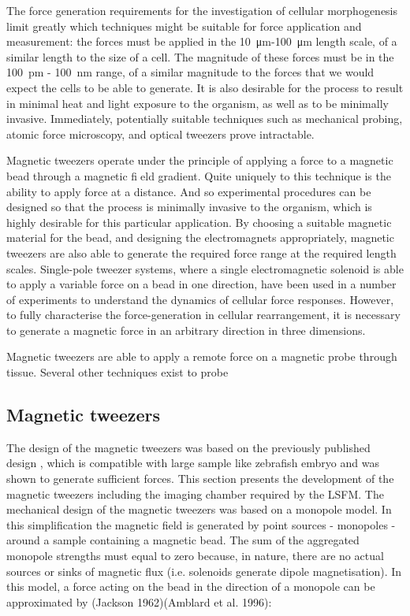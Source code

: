 The force generation requirements for the investigation of cellular morphogenesis limit greatly which techniques might be suitable for force application and measurement: the forces must be applied in the \SI{10}{\micro\meter}-\SI{100}{\micro\meter} length scale, of a similar length to the size of a cell.
The magnitude of these forces must be in the \SI{100}{\pico\meter} - \SI{100}{\nano\meter} range, of a similar magnitude to the forces that we would expect the cells to be able to generate.
It is also desirable for the process to result in minimal heat and light exposure to the organism, as well as to be minimally invasive.
Immediately, potentially suitable techniques such as mechanical probing, atomic force microscopy, and optical tweezers prove intractable.

Magnetic tweezers operate under the principle of applying a force to a magnetic bead through a magnetic field gradient.
Quite uniquely to this technique is the ability to apply force at a distance.
And so experimental procedures can be designed so that the process is minimally invasive to the organism, which is highly desirable for this particular application.
By choosing a suitable magnetic material for the bead, and designing the electromagnets appropriately, magnetic tweezers are also able to generate the required force range at the required length scales.
Single-pole tweezer systems, where a single electromagnetic solenoid is able to apply a variable force on a bead in one direction, have been used in a number of experiments to understand the dynamics of cellular force responses.
However, to fully characterise the force-generation in cellular rearrangement, it is necessary to generate a magnetic force in an arbitrary direction in three dimensions.

Magnetic tweezers are able to apply a remote force on a magnetic probe through tissue.
Several other techniques exist to probe

\subsection{Magnetic tweezers}
The design of the magnetic tweezers was based on the previously published design %
, which is compatible with large sample like zebrafish embryo and was shown to generate sufficient forces.
This section presents the development of the magnetic tweezers including the imaging chamber required by the LSFM.
The mechanical design of the magnetic tweezers was based on a monopole model.
In this simplification the magnetic field is generated by point sources - monopoles - around a sample containing a magnetic bead.
The sum of the aggregated monopole strengths must equal to zero because, in nature, there are no actual sources or sinks of magnetic flux (i.e. solenoids generate dipole magnetisation).
In this model, a force acting on the bead in the direction of a monopole can be approximated by (Jackson 1962)(Amblard et al. 1996):


